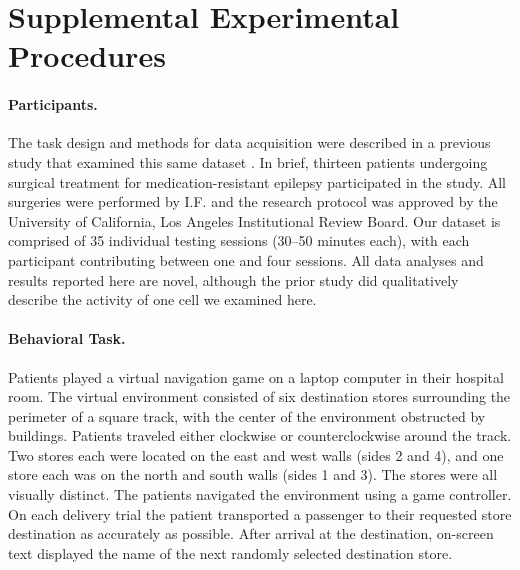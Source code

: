 \section{Supplemental Experimental Procedures}

\paragraph{Participants.} The task design and methods for data acquisition were described in a previous study that examined this same dataset \citep{JacoEtal10}. In brief, thirteen patients undergoing surgical treatment for medication-resistant epilepsy participated in the study.  All surgeries were performed by I.F. and the research protocol was approved by the University of California, Los Angeles Institutional Review Board.  Our dataset is comprised of 35 individual testing sessions (30--50 minutes each), with each participant contributing between one and four sessions.  All data analyses and results reported here are novel, although the prior study \citep{JacoEtal10} did qualitatively describe the activity of one cell we examined here.

\paragraph{Behavioral Task.} Patients played a virtual navigation game  \citep{EkstEtal03,JacoEtal10,JacoEtal13} on a laptop computer in their hospital room. The virtual environment consisted of six destination stores surrounding the perimeter of a square track, with the center of the environment obstructed by buildings. Patients traveled either clockwise or counterclockwise around the track. Two stores each were located on the east and west walls (sides 2 and 4), and one store each was on the north and south walls (sides 1 and 3). The stores were all visually distinct. The patients navigated the environment using a game controller. On each delivery trial the patient transported a passenger to their requested store destination as accurately as possible.  After arrival at the destination, on-screen text displayed the name of the next randomly selected destination store.


